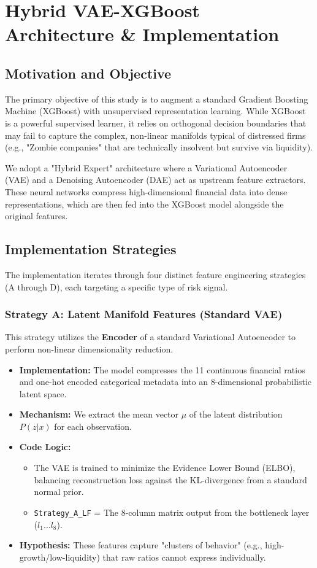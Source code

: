 \documentclass{report}\usepackage[]{graphicx}\usepackage[]{xcolor}
\begin{document}
\chapter{Hybrid VAE-XGBoost Architecture \& Implementation}

\section{Motivation and Objective}

The primary objective of this study is to augment a standard Gradient Boosting Machine (XGBoost) with unsupervised representation learning. While XGBoost is a powerful supervised learner, it relies on orthogonal decision boundaries that may fail to capture the complex, non-linear manifolds typical of distressed firms (e.g., "Zombie companies" that are technically insolvent but survive via liquidity).

We adopt a "Hybrid Expert" architecture where a Variational Autoencoder (VAE) and a Denoising Autoencoder (DAE) act as upstream feature extractors. These neural networks compress high-dimensional financial data into dense representations, which are then fed into the XGBoost model alongside the original features.

\section{Implementation Strategies}

The implementation iterates through four distinct feature engineering strategies (A through D), each targeting a specific type of risk signal.

\subsection{Strategy A: Latent Manifold Features (Standard VAE)}
This strategy utilizes the \textbf{Encoder} of a standard Variational Autoencoder to perform non-linear dimensionality reduction.

\begin{itemize}
    \item \textbf{Implementation:} The model compresses the 11 continuous financial ratios and one-hot encoded categorical metadata into an 8-dimensional probabilistic latent space.
    \item \textbf{Mechanism:} We extract the mean vector $\mu$ of the latent distribution $P(z|x)$ for each observation.
    \item \textbf{Code Logic:}
    \begin{itemize}
        \item The VAE is trained to minimize the Evidence Lower Bound (ELBO), balancing reconstruction loss against the KL-divergence from a standard normal prior.
        \item \texttt{Strategy\_A\_LF} = The 8-column matrix output from the bottleneck layer ($l_1 \dots l_8$).
    \end{itemize}
    \item \textbf{Hypothesis:} These features capture "clusters of behavior" (e.g., high-growth/low-liquidity) that raw ratios cannot express individually.
\end{itemize}
\end{document}
